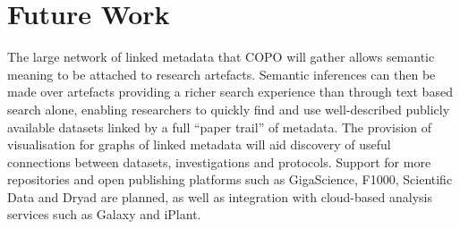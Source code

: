 \documentclass[runningheads,a4paper]{llncs}
\begin{document}
\vspace*{-0.1in}
\section{Future Work}
\vspace*{-0.1in} The large network of linked metadata that COPO will
gather allows semantic meaning to be attached to research
artefacts. Semantic inferences can then be made over artefacts
providing a richer search experience than through text based search
alone, enabling researchers to quickly find and use well-described
publicly available datasets linked by a full ``paper trail'' of
metadata. The provision of visualisation for graphs of linked metadata
will aid discovery of useful connections between datasets,
investigations and protocols. Support for more repositories and open
publishing platforms such as GigaScience, F1000, Scientific Data and
Dryad are planned, as well as integration with cloud-based analysis
services such as Galaxy and iPlant.
\end{document}
